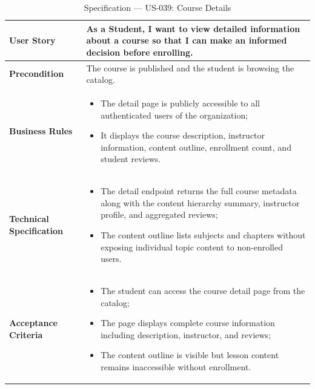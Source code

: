 \begin{table}[H]
\centering
\caption{Specification — US-039: Course Details}
\label{tab:us039}
\renewcommand{\arraystretch}{1.2}
\begin{tabularx}{\textwidth}{|p{3.5cm}|X|}
\hline
\textbf{User Story} & As a Student, I want to view detailed information about a course so that I can make an informed decision before enrolling. \\
\hline
\textbf{Precondition} & The course is published and the student is browsing the catalog. \\
\hline
\textbf{Business Rules} &
\begin{itemize}[noitemsep, topsep=2pt]
  \item The detail page is publicly accessible to all authenticated users of the organization;
  \item It displays the course description, instructor information, content outline, enrollment count, and student reviews.
\end{itemize} \\
\hline
\textbf{Technical Specification} &
\begin{itemize}[noitemsep, topsep=2pt]
  \item The detail endpoint returns the full course metadata along with the content hierarchy summary, instructor profile, and aggregated reviews;
  \item The content outline lists subjects and chapters without exposing individual topic content to non-enrolled users.
\end{itemize} \\
\hline
\textbf{Acceptance Criteria} &
\begin{itemize}[noitemsep, topsep=2pt]
  \item The student can access the course detail page from the catalog;
  \item The page displays complete course information including description, instructor, and reviews;
  \item The content outline is visible but lesson content remains inaccessible without enrollment.
\end{itemize} \\
\hline
\end{tabularx}
\end{table}

